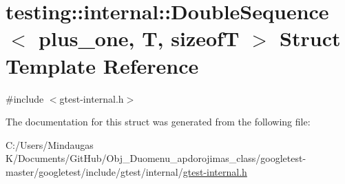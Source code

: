 \hypertarget{structtesting_1_1internal_1_1_double_sequence}{}\section{testing\+::internal\+::Double\+Sequence$<$ plus\+\_\+one, T, sizeofT $>$ Struct Template Reference}
\label{structtesting_1_1internal_1_1_double_sequence}


{\ttfamily \#include $<$gtest-\/internal.\+h$>$}



The documentation for this struct was generated from the following file\+:\begin{DoxyCompactItemize}
\item 
C\+:/\+Users/\+Mindaugas K/\+Documents/\+Git\+Hub/\+Obj\+\_\+\+Duomenu\+\_\+apdorojimas\+\_\+class/googletest-\/master/googletest/include/gtest/internal/\mbox{\hyperlink{googletest-master_2googletest_2include_2gtest_2internal_2gtest-internal_8h}{gtest-\/internal.\+h}}\end{DoxyCompactItemize}
